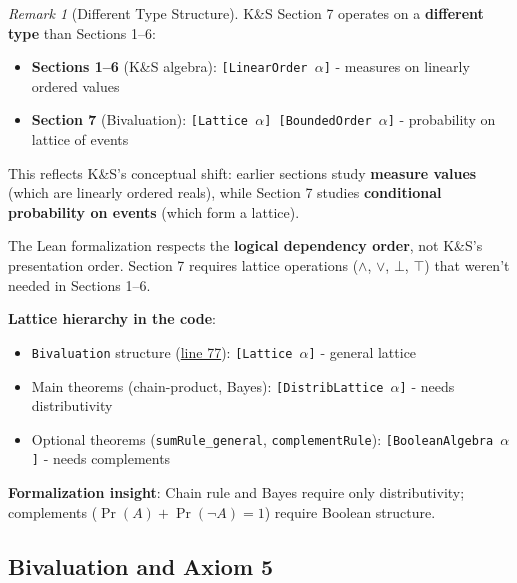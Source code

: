 \documentclass[11pt]{article}
\theoremstyle{definition}
\theoremstyle{remark}
\newtheorem{remark}[theorem]{Remark}
\begin{document}
\begin{remark}[Different Type Structure]
K\&S Section 7 operates on a \textbf{different type} than Sections 1--6:

\begin{itemize}
\item \textbf{Sections 1--6} (K\&S algebra): \texttt{[LinearOrder $\alpha$]} - measures on linearly ordered values
\item \textbf{Section 7} (Bivaluation): \texttt{[Lattice $\alpha$] [BoundedOrder $\alpha$]} - probability on lattice of events
\end{itemize}

This reflects K\&S's conceptual shift: earlier sections study \textbf{measure values} (which are linearly ordered reals), while Section 7 studies \textbf{conditional probability on events} (which form a lattice).

The Lean formalization respects the \textbf{logical dependency order}, not K\&S's presentation order. Section 7 requires lattice operations ($\wedge$, $\vee$, $\bot$, $\top$) that weren't needed in Sections 1--6.

\textbf{Lattice hierarchy in the code}:
\begin{itemize}
\item \texttt{Bivaluation} structure (\href{https://github.com/zariuq/ks-foundations-of-inference/blob/main/KnuthSkilling/Probability/ConditionalProbability/Basic.lean\#L77}{line 77}): \texttt{[Lattice $\alpha$]} - general lattice
\item Main theorems (chain-product, Bayes): \texttt{[DistribLattice $\alpha$]} - needs distributivity
\item Optional theorems (\texttt{sumRule\_general}, \texttt{complementRule}): \texttt{[BooleanAlgebra $\alpha$]} - needs complements
\end{itemize}

\textbf{Formalization insight}: Chain rule and Bayes require only distributivity; complements ($\Pr(A) + \Pr(\neg A) = 1$) require Boolean structure.
\end{remark}

\subsection{Bivaluation and Axiom 5}
\end{document}
